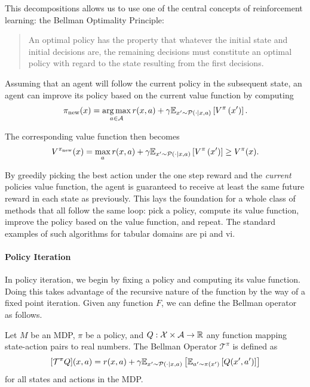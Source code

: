 This decompositions allows us to use one of the central concepts of reinforcement learning: the Bellman Optimality Principle:
\begin{quote}
    An optimal policy has the property that whatever the initial state and initial decisions are, the remaining decisions must constitute an optimal policy with regard to the state resulting from the first decisions. \parencite{bellman1953}
\end{quote}
Assuming that an agent will follow the current policy in the subsequent state, an agent can improve its policy based on the current value function by computing $$\pi_\mathrm{new}(x) = \operatorname*{arg\,max}_{a \in \mathcal{A}} r(x,a) + \gamma \mathbb{E}_{x'\sim\mathcal{P}(\cdot|x,a)}\left[V^\pi\left(x'\right)\right].$$

The corresponding value function then becomes
$$V^{\pi_\mathrm{new}}(x) = \max_a r(x,a) + \gamma \mathbb{E}_{x'\sim\mathcal{P}(\cdot|x,a)}\left[V^\pi\left(x'\right)\right] \geq V^\pi(x).$$

By greedily picking the best action under the one step reward and the \emph{current} policies value function, the agent is guaranteed to receive at least the same future reward in each state as previously.
This lays the foundation for a whole class of methods that all follow the same loop: pick a policy, compute its value function, improve the policy based on the value function, and repeat.
The standard examples of such algorithms for tabular domains are \ac{pi} and \ac{vi}.

\paragraph{Policy Iteration}

In policy iteration, we begin by fixing a policy and computing its value function.
Doing this takes advantage of the recursive nature of the function by the way of a fixed point iteration.
Given any function $F$, we can define the Bellman operator as follows.

\begin{definition}
    Let $M$ be an MDP, $\pi$ be a policy, and $Q: \mathcal{X} \times \mathcal{A} \rightarrow \mathbb{R}$ any function mapping state-action pairs to real numbers.
    The Bellman Operator $\mathcal{T}^\pi$ is defined as
    $$[\mathcal{T}^\pi Q](x,a) = r(x,a) + \gamma \mathbb{E}_{x'\sim \mathcal{P}(\cdot|x,a)}\left[\mathbb{E}_{a'\sim\pi(x')}\left[Q(x',a')\right]\right]$$ for all states and actions in the MDP.
\end{definition}

